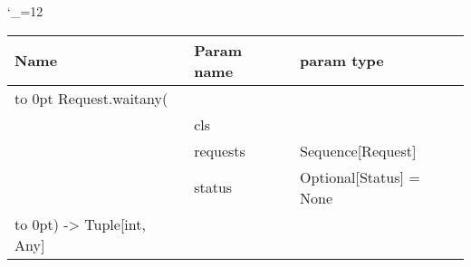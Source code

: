 \begingroup \catcode`\_=12 \tt
\begin{tabular}{lll}
\toprule
\textrm{Name}&\textrm{Param name}&\textrm{param type}\\
\midrule
\hbox to 0pt {Request.waitany(\hss}\\
& cls\\
& requests & Sequence[Request]\\
& status & Optional[Status] = None\\
\hbox to 0pt{) -> Tuple[int, Any]\hss}\\
\bottomrule
\end{tabular}
\endgroup
